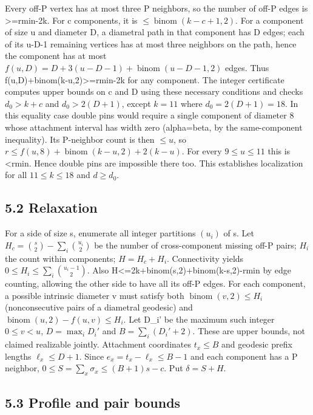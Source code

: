 \documentclass[
  11pt,
]{article}
\begin{document}
Every off-P vertex has at most three P neighbors, so the number of off-P
edges is \textgreater=rmin-2k. For c components, it is
\(\le \operatorname{binom}(k-c+1,2)\). For a component of size u and
diameter D, a diametral path in that component has D edges; each of its
u-D-1 remaining vertices has at most three neighbors on the path, hence
the component has at most
\(f(u,D)=D+3(u-D-1)+\operatorname{binom}(u-D-1,2)\) edges. Thus
f(u,D)+binom(k-u,2)\textgreater=rmin-2k for any component. The integer
certificate computes upper bounds on c and D using these necessary
conditions and checks \(d_0>k+c\) and \(d_0>2(D+1)\), except \(k=11\)
where \(d_0=2(D+1)=18\). In this equality case double pins would require
a single component of diameter 8 whose attachment interval has width
zero (alpha=beta, by the same-component inequality). Its P-neighbor
count is then \(\le u\), so
\(r\le f(u,8)+\operatorname{binom}(k-u,2)+2(k-u)\). For every
\(9\le u\le 11\) this is \textless rmin. Hence double pins are
impossible there too. This establishes localization for all
\(11\le k\le 18\) and \(d\ge d_0\).

\subsection{5.2 Relaxation}\label{relaxation}

For a side of size s, enumerate all integer partitions \((u_{i})\) of s.
Let \(H_c=\binom{s}{2}-\sum_i\binom{u_i}{2}\) be the number of
cross-component missing off-P pairs; \(H_{i}\) the count within
components; \(H=H_{c}+H_{i}\). Connectivity yields
\(0\le H_i\le\sum_i\binom{u_i-1}{2}\). Also
H\textless=2k+binom(s,2)+binom(k-s,2)-rmin by edge counting, allowing
the other side to have all its off-P edges. For each component, a
possible intrinsic diameter v must satisfy both
\(\operatorname{binom}(v,2)\le H_{i}\) (nonconsecutive pairs of a
diametral geodesic) and \(\operatorname{binom}(u,2)-f(u,v)\le H_{i}\).
Let D\_i' be the maximum such integer \(0\le v<u\),
\(D=\max_iD_i\prime\) and \(B=\sum_i(D_i\prime+2)\). These are upper
bounds, not claimed realizable jointly. Attachment coordinates
\(t_{x}\le B\) and geodesic prefix lengths \(\ell _{x}\le D+1\). Since
\(e_{x}=t_{x}-\ell _{x}\le B-1\) and each component has a P neighbor,
\(0\le S=\sum_x\sigma_x\le(B+1)s-c\). Put \(\delta =S+H\).

\subsection{5.3 Profile and pair bounds}\label{profile-and-pair-bounds}
\end{document}
